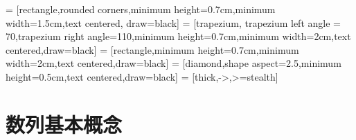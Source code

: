  \Teach{}
  \newtheorem*{Theorem}{定理}
  \makefront
\vspace{-1.5em}
   = [rectangle,rounded corners,minimum height=0.7cm,minimum width=1.5cm,text centered, draw=black]
   = [trapezium, trapezium left angle = 70,trapezium right angle=110,minimum height=0.7cm,minimum width=2cm,text centered,draw=black]
   = [rectangle,minimum height=0.7cm,minimum width=2cm,text centered,draw=black]
   = [diamond,shape aspect=2.5,minimum height=0.5cm,text centered,draw=black]
   = [thick,->,>=stealth]
\startexercise
\section{数列基本概念}

